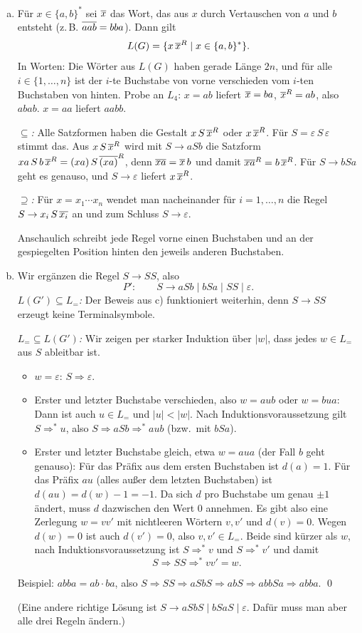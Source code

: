 \begin{loesung}
\begin{enumerate}[a)]
  \item Für $x\in\{a,b\}^*$ sei $\overline{x}$ das Wort, das aus $x$ durch Vertauschen von $a$ und $b$ entsteht (z.\,B. $\overline{aab}=bba$). Dann gilt
  \[L(G)=\{x\,\overline{x}^R\mid x\in\{a,b\}^*\}.\]
  In Worten: Die Wörter aus $L(G)$ haben gerade Länge $2n$, und für alle $i\in\{1,\dots,n\}$ ist der $i$-te Buchstabe von vorne verschieden vom $i$-ten Buchstaben von hinten. Probe an $L_4$: $x=ab$ liefert $\overline{x}=ba$, $\overline{x}^R=ab$, also $abab$. $x=aa$ liefert $aabb$.

  \emph{$\subseteq$:} Alle Satzformen haben die Gestalt $x\,S\,\overline{x}^R$ oder $x\,\overline{x}^R$. Für $S=\varepsilon\,S\,\varepsilon$ stimmt das. Aus $x\,S\,\overline{x}^R$ wird mit $S\to aSb$ die Satzform $xa\,S\,b\,\overline{x}^R=(xa)\,S\,\overline{(xa)}^R$, denn $\overline{xa}=\overline{x}\,b$ und damit $\overline{xa}^R=b\,\overline{x}^R$. Für $S\to bSa$ geht es genauso, und $S\to\varepsilon$ liefert $x\,\overline{x}^R$.

  \emph{$\supseteq$:} Für $x=x_1\cdots x_n$ wendet man nacheinander für $i=1,\dots,n$ die Regel $S\to x_i\,S\,\overline{x_i}$ an und zum Schluss $S\to\varepsilon$.

  Anschaulich schreibt jede Regel vorne einen Buchstaben und an der gespiegelten Position hinten den jeweils anderen Buchstaben.

  \item Wir ergänzen die Regel $S\to SS$, also
  \[P':\qquad S\to aSb\mid bSa\mid SS\mid\varepsilon.\]
  \emph{$L(G')\subseteq L_{=}$:} Der Beweis aus c) funktioniert weiterhin, denn $S\to SS$ erzeugt keine Terminalsymbole.

  \emph{$L_{=}\subseteq L(G')$:} Wir zeigen per starker Induktion über $|w|$, dass jedes $w\in L_{=}$ aus $S$ ableitbar ist.
  \begin{itemize}
    \item $w=\varepsilon$: $S\Rightarrow\varepsilon$.
    \item Erster und letzter Buchstabe verschieden, also $w=aub$ oder $w=bua$: Dann ist auch $u\in L_{=}$ und $|u|<|w|$. Nach Induktionsvoraussetzung gilt $S\Rightarrow^* u$, also $S\Rightarrow aSb\Rightarrow^* aub$ (bzw.\ mit $bSa$).
    \item Erster und letzter Buchstabe gleich, etwa $w=aua$ (der Fall $b$ geht genauso): Für das Präfix aus dem ersten Buchstaben ist $d(a)=1$. Für das Präfix $au$ (alles außer dem letzten Buchstaben) ist $d(au)=d(w)-1=-1$. Da sich $d$ pro Buchstabe um genau $\pm1$ ändert, muss $d$ dazwischen den Wert $0$ annehmen. Es gibt also eine Zerlegung $w=vv'$ mit nichtleeren Wörtern $v,v'$ und $d(v)=0$. Wegen $d(w)=0$ ist auch $d(v')=0$, also $v,v'\in L_{=}$. Beide sind kürzer als $w$, nach Induktionsvoraussetzung ist $S\Rightarrow^* v$ und $S\Rightarrow^* v'$ und damit
    \[S\Rightarrow SS\Rightarrow^* vv'=w.\]
  \end{itemize}
  Beispiel: $abba=ab\cdot ba$, also $S\Rightarrow SS\Rightarrow aSbS\Rightarrow abS\Rightarrow abbSa\Rightarrow abba$. \qed

  (Eine andere richtige Lösung ist $S\to aSbS\mid bSaS\mid\varepsilon$. Dafür muss man aber alle drei Regeln ändern.)
\end{enumerate}
\end{loesung}

